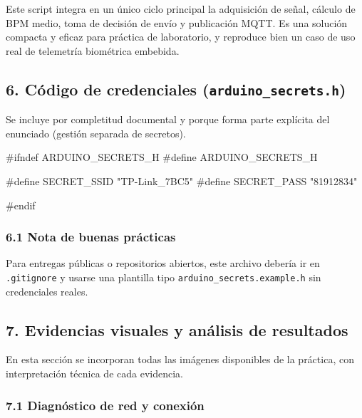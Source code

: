 \documentclass[11pt]{article}
\newenvironment{Shaded}{}{}
\newcommand{\StringTok}[1]{\textcolor[rgb]{0.25,0.44,0.63}{{#1}}}
\newcommand{\PreprocessorTok}[1]{\textcolor[rgb]{0.74,0.48,0.00}{{#1}}}
\begin{document}
Este script integra en un único ciclo principal la adquisición de señal,
cálculo de BPM medio, toma de decisión de envío y publicación MQTT. Es
una solución compacta y eficaz para práctica de laboratorio, y reproduce
bien un caso de uso real de telemetría biométrica embebida.

    \subsection{\texorpdfstring{6. Código de credenciales
(\texttt{arduino\_secrets.h})}{6. Código de credenciales (arduino\_secrets.h)}}\label{cuxf3digo-de-credenciales-arduino_secrets.h}

Se incluye por completitud documental y porque forma parte explícita del
enunciado (gestión separada de secretos).

\begin{Shaded}
\begin{Highlighting}[]
\PreprocessorTok{\#ifndef ARDUINO\_SECRETS\_H}
\PreprocessorTok{\#define ARDUINO\_SECRETS\_H}

\PreprocessorTok{\#define SECRET\_SSID }\StringTok{"TP{-}Link\_7BC5"}
\PreprocessorTok{\#define SECRET\_PASS }\StringTok{"81912834"}

\PreprocessorTok{\#endif}
\end{Highlighting}
\end{Shaded}

\subsubsection{6.1 Nota de buenas
prácticas}\label{nota-de-buenas-pruxe1cticas}

Para entregas públicas o repositorios abiertos, este archivo debería ir
en \texttt{.gitignore} y usarse una plantilla tipo
\texttt{arduino\_secrets.example.h} sin credenciales reales.

    \subsection{7. Evidencias visuales y análisis de
resultados}\label{evidencias-visuales-y-anuxe1lisis-de-resultados}

En esta sección se incorporan todas las imágenes disponibles de la
práctica, con interpretación técnica de cada evidencia.

\subsubsection{7.1 Diagnóstico de red y
conexión}\label{diagnuxf3stico-de-red-y-conexiuxf3n}
\end{document}

